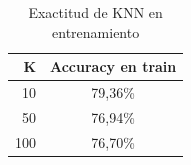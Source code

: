 \begin{table}[H]
\caption{Exactitud de KNN en entrenamiento}
\label{tab:knn_fijos}
\centering
\begin{tabular}{rc}
\toprule
K & Accuracy en train \\
\midrule
10 & 79,36\% \\
50 & 76,94\% \\
100 & 76,70\% \\
\bottomrule
\end{tabular}
\end{table}
